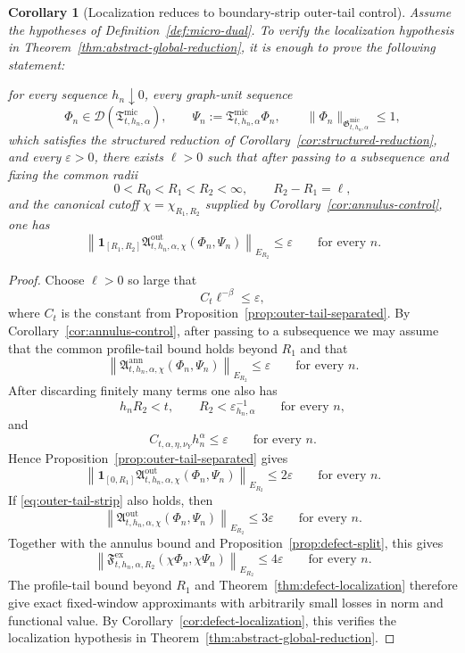\documentclass[11pt,a4paper]{amsart}
\theoremstyle{plain}
\newtheorem{corollary}[theorem]{Corollary}
\theoremstyle{definition}
\theoremstyle{remark}
\newcommand{\one}{\mathbf 1}
\begin{document}
\begin{corollary}[Localization reduces to boundary-strip outer-tail control]
\label{cor:outer-tail-reduction}
Assume the hypotheses of Definition~\ref{def:micro-dual}. To verify the localization hypothesis in
Theorem~\ref{thm:abstract-global-reduction}, it is enough to prove the following statement:

\smallskip
\noindent
for every sequence \(h_n\downarrow0\), every graph-unit sequence
\[
\Phi_n\in\mathcal D(\mathfrak T_{t,h_n,\alpha}^{\mathrm{mic}}),
\qquad
\Psi_n:=\mathfrak T_{t,h_n,\alpha}^{\mathrm{mic}}\Phi_n,
\qquad
\|\Phi_n\|_{\mathfrak G_{t,h_n,\alpha}^{\mathrm{mic}}}\le1,
\]
which satisfies the structured reduction of Corollary~\ref{cor:structured-reduction}, and every
\(\varepsilon>0\), there exists \(\ell>0\) such that after passing to a subsequence and fixing the
common radii
\[
0<R_0<R_1<R_2<\infty,
\qquad
R_2-R_1=\ell,
\]
and the canonical cutoff \(\chi=\chi_{R_1,R_2}\) supplied by Corollary~\ref{cor:annulus-control},
one has
\begin{equation}\label{eq:outer-tail-strip}
\left\|
\one_{[R_1,R_2]}
\mathfrak A_{t,h_n,\alpha,\chi}^{\mathrm{out}}(\Phi_n,\Psi_n)
\right\|_{E_{R_2}}
\le
\varepsilon
\qquad\text{for every }n.
\end{equation}
\end{corollary}

\begin{proof}
Choose \(\ell>0\) so large that
\[
C_t\ell^{-\beta}\le \varepsilon,
\]
where \(C_t\) is the constant from Proposition~\ref{prop:outer-tail-separated}. By
Corollary~\ref{cor:annulus-control}, after passing to a subsequence we may assume that the common
profile-tail bound holds beyond \(R_1\) and that
\[
\left\|
\mathfrak A_{t,h_n,\alpha,\chi}^{\mathrm{ann}}(\Phi_n,\Psi_n)
\right\|_{E_{R_2}}
\le
\varepsilon
\qquad\text{for every }n.
\]
After discarding finitely many terms one also has
\[
h_nR_2<t,
\qquad
R_2<\varepsilon_{h_n,\alpha}^{-1}
\qquad\text{for every }n,
\]
and
\[
C_{t,\alpha,\eta,\nu_Y}h_n^\alpha\le \varepsilon
\qquad\text{for every }n.
\]
Hence Proposition~\ref{prop:outer-tail-separated} gives
\[
\left\|
\one_{[0,R_1]}
\mathfrak A_{t,h_n,\alpha,\chi}^{\mathrm{out}}(\Phi_n,\Psi_n)
\right\|_{E_{R_2}}
\le
2\varepsilon
\qquad\text{for every }n.
\]
If \eqref{eq:outer-tail-strip} also holds, then
\[
\left\|
\mathfrak A_{t,h_n,\alpha,\chi}^{\mathrm{out}}(\Phi_n,\Psi_n)
\right\|_{E_{R_2}}
\le
3\varepsilon
\qquad\text{for every }n.
\]
Together with the annulus bound and Proposition~\ref{prop:defect-split}, this gives
\[
\left\|
\mathfrak F_{t,h_n,\alpha,R_2}^{\mathrm{ex}}(\chi\Phi_n,\chi\Psi_n)
\right\|_{E_{R_2}}
\le
4\varepsilon
\qquad\text{for every }n.
\]
The profile-tail bound beyond \(R_1\) and Theorem~\ref{thm:defect-localization} therefore give
exact fixed-window approximants with arbitrarily small losses in norm and functional value. By
Corollary~\ref{cor:defect-localization}, this verifies the localization hypothesis in
Theorem~\ref{thm:abstract-global-reduction}.
\end{proof}
\end{document}
